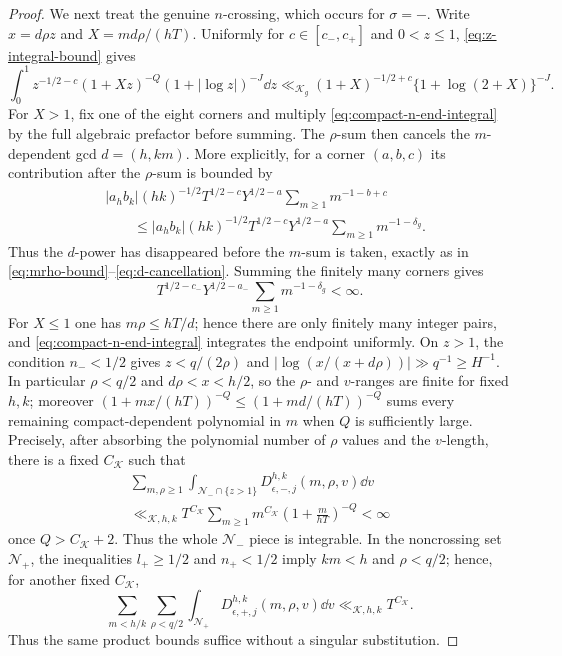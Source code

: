 \begin{proof}
We next treat the genuine $n$-crossing, which occurs for $\sigma=-$.
Write $x=d\rho z$ and $X=md\rho/(hT)$.  Uniformly for
$c\in[c_-,c_+]$ and $0<z\leq1$, \eqref{eq:z-integral-bound} gives
\begin{equation}\label{eq:compact-n-end-integral}
 \int_0^1z^{-1/2-c}(1+Xz)^{-Q}
 (1+|\log z|)^{-J}\dd z
 \ll_{\mathscr K_g}(1+X)^{-1/2+c}
 \{1+\log(2+X)\}^{-J}.
\end{equation}
For $X>1$, fix one of the eight corners and multiply
\eqref{eq:compact-n-end-integral} by the full algebraic prefactor before
summing.  The $\rho$-sum then cancels the $m$-dependent gcd $d=(h,km)$.
More explicitly, for a corner $(a,b,c)$ its contribution after the
$\rho$-sum is bounded by
\begin{equation}\label{eq:compact-n-corner-exponent}
 \begin{aligned}
 &|a_hb_k|(hk)^{-1/2}T^{1/2-c}Y^{1/2-a}
     \sum_{m\geq1}m^{-1-b+c}\\
 &\qquad\leq
 |a_hb_k|(hk)^{-1/2}T^{1/2-c}Y^{1/2-a}
     \sum_{m\geq1}m^{-1-\delta_g}.
 \end{aligned}
\end{equation}
Thus the $d$-power has disappeared before the $m$-sum is taken, exactly as in
\eqref{eq:mrho-bound}--\eqref{eq:d-cancellation}.  Summing the finitely many
corners gives
\begin{equation}\label{eq:compact-n-end-sum}
 T^{1/2-c_-}Y^{1/2-a_-}
 \sum_{m\geq1}m^{-1-\delta_g}<\infty.
\end{equation}
For $X\leq1$ one has $m\rho\leq hT/d$; hence there are only finitely many
integer pairs, and \eqref{eq:compact-n-end-integral} integrates the endpoint
uniformly.  On $z>1$, the condition $n_-<1/2$ gives
$z<q/(2\rho)$ and
$|\log(x/(x+d\rho))|\gg q^{-1}\geq H^{-1}$.
In particular $\rho<q/2$ and $d\rho<x<h/2$, so the $\rho$- and $v$-ranges
are finite for fixed $h,k$; moreover
$(1+mx/(hT))^{-Q}\leq(1+md/(hT))^{-Q}$ sums every remaining compact-dependent
polynomial in $m$ when $Q$ is sufficiently large.  Precisely, after absorbing
the polynomial number of $\rho$ values and the $v$-length, there is a fixed
$C_{\mathscr K}$ such that
\begin{multline}\label{eq:compact-n-large-bound}
 \sum_{m,\rho\geq1}\int_{\mathcal N_-\cap\{z>1\}}
 D_{\epsilon,-,j}^{h,k}(m,\rho,v)\dd v\\
 \ll_{\mathscr K,h,k}T^{C_{\mathscr K}}
 \sum_{m\geq1}m^{C_{\mathscr K}}
       \left(1+\frac{m}{hT}\right)^{-Q}<\infty
\end{multline}
once $Q>C_{\mathscr K}+2$.  Thus the whole
$\mathcal N_-$ piece is integrable.  In the noncrossing set
$\mathcal N_+$, the inequalities $l_+\geq1/2$ and $n_+<1/2$ imply
$km<h$ and $\rho<q/2$; hence, for another fixed $C_{\mathscr K}$,
\[
 \sum_{m<h/k}\sum_{\rho<q/2}\int_{\mathcal N_+}
 D_{\epsilon,+,j}^{h,k}(m,\rho,v)\dd v
 \ll_{\mathscr K,h,k}T^{C_{\mathscr K}}.
\]
Thus the same product bounds suffice without a singular substitution.


\end{proof}
